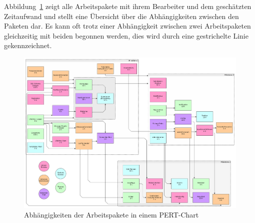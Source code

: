 
Abbildung~\ref{fig:pert} zeigt alle Arbeitspakete mit ihrem Bearbeiter und dem geschätzten Zeitaufwand
und stellt eine Übersicht über die Abhängigkeiten zwischen den Paketen dar.
Es kann oft trotz einer Abhängigkeit zwischen zwei Arbeitspaketen gleichzeitig mit beiden begonnen werden,
dies wird durch eine gestrichelte Linie gekennzeichnet.

\begin{figure}
    \includegraphics[width=\textwidth]{graphics/pert-diagram}
    \caption{Abhängigkeiten der Arbeitspakete in einem PERT-Chart}
    \label{fig:pert}
\end{figure}